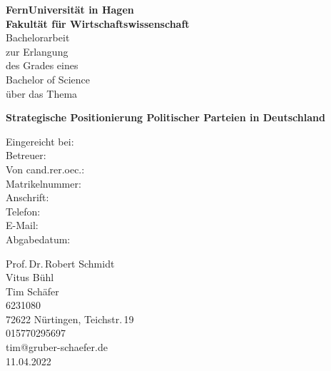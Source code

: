 \documentclass[oneside,12pt,a4paper]{report}
\begin{document}
 
\begin{titlepage}
	\raggedright
	{\huge\bf FernUniversität in Hagen\\[0.5cm]}
	{\LARGE\bf Fakultät für Wirtschaftswissenschaft\\[1.5cm]}
	{\large\doublespacing
		Bachelorarbeit\\
		zur Erlangung\\
		\singlespacing des Grades eines\\
		Bachelor of Science\\
		\doublespacing über das Thema\\[2cm]
	}
	\begin{center}
	{\huge\bf Strategische Positionierung Politischer Parteien in Deutschland\\[3cm]}
	\end{center}
	\vfill
	\begin{minipage}{\textwidth}
		\doublespacing
		\parbox[t][4.5cm][t]{3.5cm}{
			Eingereicht bei:\\
			Betreuer:\\
			Von cand.rer.oec.:\\
			Matrikelnummer:\\
			Anschrift:\\
			Telefon:\\
			E-Mail:\\
			Abgabedatum:\\
		}\hfill
		\parbox[t][2cm][t]{11cm}{
			Prof.\,Dr.\,Robert Schmidt \\
			Vitus Bühl\\
			Tim Schäfer\\
			6231080\\
			72622 Nürtingen, Teichstr.\,19\\
			015770295697\\
			tim@gruber-schaefer.de\\
			11.04.2022
		}
	\end{minipage}
\end{titlepage}



\setcounter{page}{1}

\end{document}
